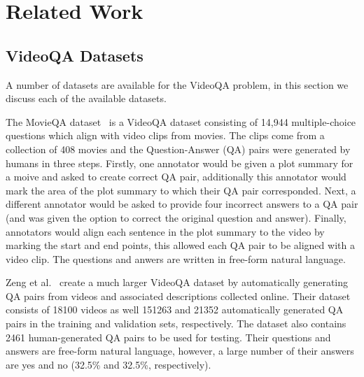 \documentclass[../interim.tex]{subfiles}
\begin{document}
\section{Related Work} \label{section:related}

\subsection{VideoQA Datasets}

A number of datasets are available for the VideoQA problem, in this section we discuss each of the available datasets.

The MovieQA dataset~\cite{dataset:movie-qa} is a VideoQA dataset consisting of 14,944 multiple-choice questions which align with video clips from movies. The clips come from a collection of 408 movies and the Question-Answer (QA) pairs were generated by humans in three steps. Firstly, one annotator would be given a plot summary for a moive and asked to create correct QA pair, additionally this annotator would mark the area of the plot summary to which their QA pair corresponded. Next, a different annotator would be asked to provide four incorrect answers to a QA pair (and was given the option to correct the original question and answer). Finally, annotators would align each sentence in the plot summary to the video by marking the start and end points, this allowed each QA pair to be aligned with a video clip. The questions and anwers are written in free-form natural language.

Zeng et al.~\cite{dataset:zeng} create a much larger VideoQA dataset by automatically generating QA pairs from videos and associated descriptions collected online. Their dataset consists of 18100 videos as well 151263 and 21352 automatically generated QA pairs in the training and validation sets, respectively. The dataset also contains 2461 human-generated QA pairs to be used for testing. Their questions and answers are free-form natural language, however, a large number of their answers are yes and no (32.5\% and 32.5\%, respectively).
\end{document}
